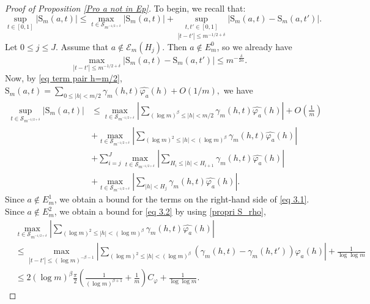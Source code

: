 \documentclass[12pt]{amsart}
\theoremstyle{definition}
\numberwithin{equation}{section}
\numberwithin{equation}{section}
\def\Ecal{\mathcal{E}}
\def\Scal{\mathcal{S}}
\def\B{\mathrm{S}}
\def\Mp{C_\varphi}
\begin{document}
\begin{proof}[Proof of Proposition \ref{Pro a not in Ep}]
To begin, we recall that:
\begin{equation} \label{(1)}
\sup_{t\in [0,1]} \left|\B_m(a,t)\right|
\leq 
\max_{t\in \Scal_{m^{-1/2+\delta}}} \left|\B_m(a,t)
\right|
+\underset{|t-t'|\leq m^{-1/2+\delta}}{\sup_{t,t'\in [0,1]}} \left|\B_m(a,t)-\B_m(a,t')
\right|.
\end{equation} 
Let \(0 \leq j \leq J\). Assume that \(a \notin \Ecal_m(H_j)\). Then \(a \notin E_m^0\), so we already have
\begin{equation} \label{(2)}
\max_{|t-t'|\leq m^{-1/2+\delta}}\left|
\B_m(a,t)-\B_m(a,t')
\right| \leq
m^{-\frac{\delta}{2\alpha}}.
\end{equation}
Now, by \eqref{eq term pair h=m/2}, $\B_m(a,t) = \sum_{0 \leq|h|< m/2}\gamma_m(h,t)\widehat{\varphi_a}(h) + O(1/m),$ we have
\begin{align}
\sup_{t\in \Scal_{m^{-1/2+\delta}}} \left|\B_m(a,t)\right|
& \leq \label{eq 3.1}
\max_{t\in \Scal_{m^{-1/2+\delta}}} \left|
\sum_{(\log m)^\beta\leq|h|< m/2}\gamma_m(h,t)\widehat{\varphi_a}(h)
\right| + O\left(\frac{1}{m} \right)\\
&\label{eq 3.2}
+\max_{t\in \Scal_{m^{-1/2+\delta}}} \left|
\sum_{(\log m)^2\leq|h|< (\log m)^\beta}\gamma_m(h,t)\widehat{\varphi_a}(h)
\right| \\
\label{eq 3.3}
&+{\sum_{i=j}^{J}}
\max_{t\in \Scal_{m^{-1/2+\delta}}} \left|
\sum_{H_i \leq|h|< H_{i+1}}\gamma_m(h,t)\widehat{\varphi_a}(h)
\right|\\
\label{eq 3.4}
&+\max_{t\in \Scal_{m^{-1/2+\delta}}} \left|
\sum_{|h|<H_j}\gamma_m(h,t)\widehat{\varphi_a}(h)
\right|.
\end{align}
Since \(a \notin E_m^1\), we obtain a bound for the terms on the right-hand side of \eqref{eq 3.1}.
Since \(a \notin E_m^2\), we obtain a bound for \eqref{eq 3.2} by using \eqref{propri S_rho},
\begin{align*}
&\max_{t\in \Scal_{m^{-1/2+\delta}}} \left|
\sum_{(\log m)^2\leq|h|< (\log m)^\beta}\gamma_m(h,t)\widehat{\varphi_a}(h)
\right|\\
&\leq
\max_{
\left|t-t' \right| 
\leq (\log m)^{-\beta-1}} \left|
\sum_{(\log m)^2\leq|h|< (\log m)^\beta}(\gamma_m(h,t)-\gamma_m(h,t'))\widehat{\varphi_a}(h)
\right|+ \frac{1}{\log \log m}\\
&\leq 2(\log m)^\beta \frac{\pi}{2}\left(\frac{1}{(\log m)^{\beta +1} }+ \frac{1}{m} \right)\Mp + \frac{1}{\log \log m}
.
\end{align*}

\end{proof}
\end{document}
